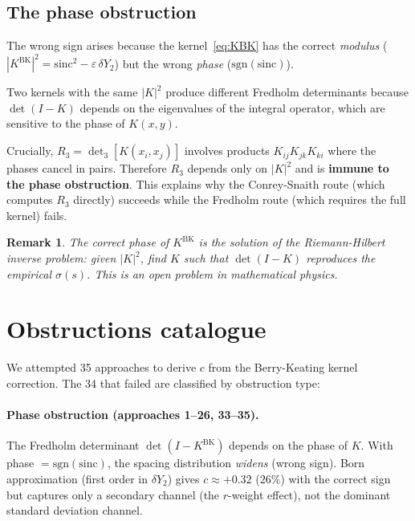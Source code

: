 \documentclass[11pt]{article}
\newtheorem{remark}[theorem]{Remark}
\begin{document}
\subsection{The phase obstruction}

The wrong sign arises because the kernel~\eqref{eq:KBK} has the correct
\emph{modulus} ($|K^{\mathrm{BK}}|^2 = \mathrm{sinc}^2 - \varepsilon\,\delta Y_2$)
but the wrong \emph{phase} ($\mathrm{sgn}(\mathrm{sinc})$).

Two kernels with the same $|K|^2$ produce different Fredholm determinants
because $\det(I - K)$ depends on the eigenvalues of the integral operator,
which are sensitive to the phase of $K(x,y)$.

Crucially, $R_3 = \det_3[K(x_i, x_j)]$ involves products $K_{ij} K_{jk} K_{ki}$
where the phases cancel in pairs. Therefore $R_3$ depends only on $|K|^2$
and is \textbf{immune to the phase obstruction}. This explains why the
Conrey-Snaith route (which computes $R_3$ directly) succeeds while the
Fredholm route (which requires the full kernel) fails.

\begin{remark}
The correct phase of $K^{\mathrm{BK}}$ is the solution of the Riemann-Hilbert
inverse problem: given $|K|^2$, find $K$ such that $\det(I - K)$ reproduces
the empirical $\sigma(s)$. This is an open problem in mathematical physics.
\end{remark}


\section{Obstructions catalogue}
\label{sec:obstructions}

We attempted 35 approaches to derive $c$ from the Berry-Keating kernel
correction. The 34 that failed are classified by obstruction type:

\paragraph{Phase obstruction (approaches 1--26, 33--35).}
The Fredholm determinant $\det(I - K^{\mathrm{BK}})$ depends on the phase of
$K$. With phase $= \mathrm{sgn}(\mathrm{sinc})$, the spacing distribution
\emph{widens} (wrong sign). Born approximation (first order in $\delta Y_2$)
gives $c \approx +0.32$ ($26\%$) with the correct sign but captures only
a secondary channel (the $r$-weight effect), not the dominant standard
deviation channel.
\end{document}

